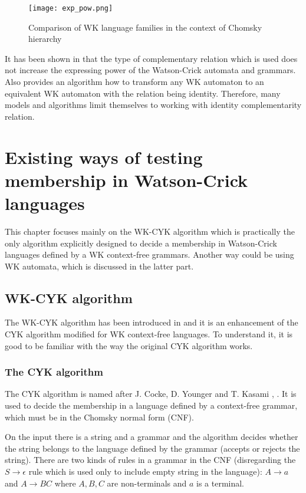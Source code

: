 \begin{figure}[h!]
  \texttt{[image: exp\_pow.png]}
  \centering
  \label{fig:expr-power}
  \caption{Comparison of WK language families in the context of Chomsky hierarchy}
\end{figure}

It has been shown in \cite{COMPL_REL} that the type of complementary relation which is used does not increase the expressing power of the Watson-Crick automata and grammars. Also \cite{SURVEY} provides an algorithm how to transform any WK automaton to an equivalent WK automaton with the relation being identity. Therefore, many models and algorithms limit themselves to working with identity complementarity relation.

\chapter{Existing ways of testing membership in Watson-Crick languages} \label{chapter:WK_CYK}

This chapter focuses mainly on the WK-CYK algorithm which is practically the only algorithm explicitly designed to decide a membership in Watson-Crick languages defined by a WK context-free grammars. Another way could be using WK automata, which is discussed in the latter part.

\section{WK-CYK algorithm}
The WK-CYK algorithm has been introduced in \cite{WK_CYK} and it is an enhancement of the CYK algorithm modified for WK context-free languages. To understand it, it is good to be familiar with the way the original CYK algorithm works.

\subsection{The CYK algorithm}
The CYK algorithm is named after J. Cocke, D. Younger and T. Kasami \cite{CYK1}, \cite{CYK2} \cite{CYK3}. It is used to decide the membership in a language defined by a context-free grammar, which must be in the Chomsky normal form (CNF).

On the input there is a string and a grammar and the algorithm decides whether the string belongs to the language defined by the grammar (accepts or rejects the string). There are two kinds of rules in a grammar in the CNF (disregarding the $S \rightarrow \epsilon$ rule which is used only to include empty string in the language): $A \rightarrow a$ and $A \rightarrow BC$ where $A, B, C$ are non-terminals and $a$ is a terminal.

